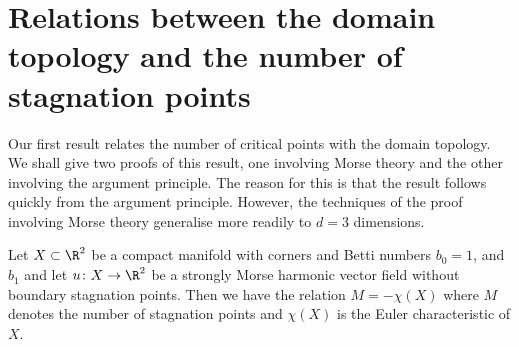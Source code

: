 \section{Relations between the domain topology and the number of stagnation points}
Our first result relates the number of critical points with the domain topology.
We shall give two proofs of this result, one involving Morse theory and the other involving
the argument principle. The reason for this is that the result follows quickly from the
argument principle. However, the techniques of the proof involving Morse theory generalise
more readily to $d=3$ dimensions.
\begin{proposition}\label{pr:n2_hvf_noInflowNoOutflow}
  Let $X\subset\R^2$ be a compact manifold with corners and Betti numbers $b_0=1$, and $b_1$
  and let $u\colon X\to\R^2$ be
  a strongly Morse harmonic vector field without boundary stagnation points.
  Then we have the relation $M=-\chi(X)$ where $M$ denotes the number of stagnation points and
  $\chi(X)$ is the Euler characteristic of $X$.
\end{proposition}

